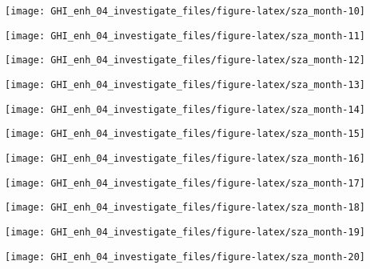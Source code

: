 \documentclass[
  10pt,
  a4paper,oneside]{article}
\begin{document}
\begin{center}\texttt{[image: GHI\_enh\_04\_investigate\_files/figure-latex/sza\_month-10]} \end{center}

\begin{center}\texttt{[image: GHI\_enh\_04\_investigate\_files/figure-latex/sza\_month-11]} \end{center}

\begin{center}\texttt{[image: GHI\_enh\_04\_investigate\_files/figure-latex/sza\_month-12]} \end{center}

\begin{center}\texttt{[image: GHI\_enh\_04\_investigate\_files/figure-latex/sza\_month-13]} \end{center}

\begin{center}\texttt{[image: GHI\_enh\_04\_investigate\_files/figure-latex/sza\_month-14]} \end{center}

\begin{center}\texttt{[image: GHI\_enh\_04\_investigate\_files/figure-latex/sza\_month-15]} \end{center}

\begin{center}\texttt{[image: GHI\_enh\_04\_investigate\_files/figure-latex/sza\_month-16]} \end{center}

\begin{center}\texttt{[image: GHI\_enh\_04\_investigate\_files/figure-latex/sza\_month-17]} \end{center}

\begin{center}\texttt{[image: GHI\_enh\_04\_investigate\_files/figure-latex/sza\_month-18]} \end{center}

\begin{center}\texttt{[image: GHI\_enh\_04\_investigate\_files/figure-latex/sza\_month-19]} \end{center}

\begin{center}\texttt{[image: GHI\_enh\_04\_investigate\_files/figure-latex/sza\_month-20]} \end{center}
\end{document}
